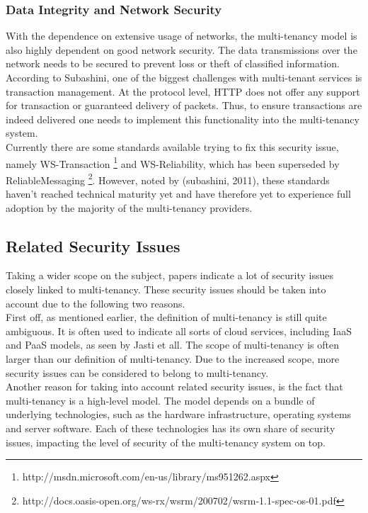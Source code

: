 \subsubsection{Data Integrity and Network Security}
With the dependence on extensive usage of networks, the multi-tenancy model is also highly dependent on good network security.  The data transmissions over the network needs to be secured to prevent loss or theft of classified information. According to Subashini\cite{Subashini2011Security}, one of the biggest challenges with multi-tenant services is transaction management. At the protocol level, HTTP does not offer any support for transaction or guaranteed delivery of packets. Thus, to ensure transactions are indeed delivered one needs to implement this functionality into the multi-tenancy system.\\
	Currently there are some standards available trying to fix this security issue, namely WS-Transaction \footnote{http://msdn.microsoft.com/en-us/library/ms951262.aspx} and WS-Reliability, which has been superseded by ReliableMessaging \footnote{http://docs.oasis-open.org/ws-rx/wsrm/200702/wsrm-1.1-spec-os-01.pdf}. However, noted by (subashini, 2011), these standards haven’t reached technical maturity yet and have therefore yet to experience full adoption by the majority of the multi-tenancy providers.

\subsection{Related Security Issues}
Taking a wider scope on the subject, papers indicate a lot of security issues closely linked to multi-tenancy. These security issues should be taken into account due to the following two reasons.\\
First off, as mentioned earlier, the definition of multi-tenancy is still quite ambiguous. It is often used to indicate all sorts of cloud services, including IaaS and PaaS models, as seen by Jasti et all\cite{Jasti2010Security}. The scope of multi-tenancy is often larger than our definition of multi-tenancy. Due to the increased scope, more security issues can be considered to belong to multi-tenancy. \\
Another reason for taking into account related security issues, is the fact that multi-tenancy is a high-level model. The model depends on a bundle of underlying technologies, such as the hardware infrastructure, operating systems and server software. Each of these technologies has its own share of security issues, impacting the level of security of the multi-tenancy system on top. 

